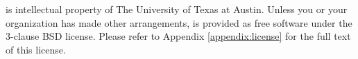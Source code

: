 
\libflame is intellectual property of The University of Texas at Austin.
Unless you or your organization has made other arrangements, \libflame is
provided as free software under the 3-clause BSD license.
Please refer to Appendix \ref{appendix:license} for the full text of this
license.


